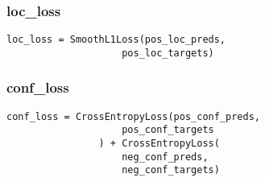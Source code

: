 \subsubsection{loc\_loss}
\begin{lstlisting}[caption={location损失}]
	loc_loss = SmoothL1Loss(pos_loc_preds, 
					pos_loc_targets)
\end{lstlisting}
\subsubsection{conf\_loss}
\begin{lstlisting}[caption={confidence损失}]
	conf_loss = CrossEntropyLoss(pos_conf_preds,
					pos_conf_targets
				) + CrossEntropyLoss(
					neg_conf_preds,
					neg_conf_targets)
\end{lstlisting}